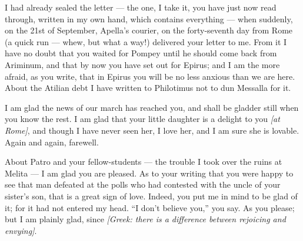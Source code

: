 

 I had already sealed the letter --- the one, I take it, you have just now read through, written in my own hand, which contains everything --- when suddenly, on the 21st of September, Apella's courier, on the forty-seventh day from Rome (a quick run --- whew, but what a way!) delivered your letter to me. From it I have no doubt that you waited for Pompey until he should come back from Ariminum, and that by now you have set out for Epirus; and I am the more afraid, as you write, that in Epirus you will be no less anxious than we are here. About the Atilian debt I have written to Philotimus not to dun Messalla for it.

 I am glad the news of our march has reached you, and shall be gladder still when you know the rest. I am glad that your little daughter is a delight to you \textit{[at Rome]}, and though I have never seen her, I love her, and I am sure she is lovable. Again and again, farewell.

 About Patro and your fellow-students --- the trouble I took over the ruins at Melita --- I am glad you are pleased. As to your writing that you were happy to see that man defeated at the polls who had contested with the uncle of your sister's son, that is a great sign of love. Indeed, you put me in mind to be glad of it; for it had not entered my head. ``I don't believe you,'' you say. As you please; but I am plainly glad, since \textit{[Greek: there is a difference between rejoicing and envying]}.

